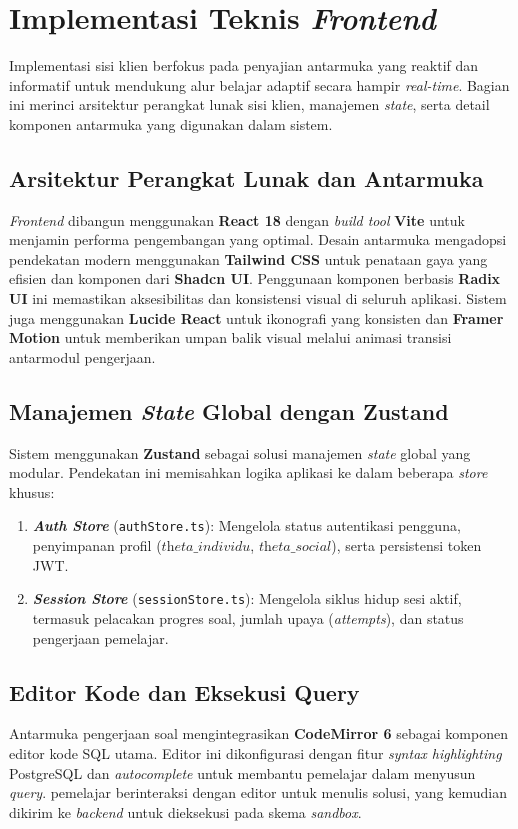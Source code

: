 \section{Implementasi Teknis \textit{Frontend}}
\label{sec:frontend_implementation}

Implementasi sisi klien berfokus pada penyajian antarmuka yang reaktif dan informatif untuk mendukung alur belajar adaptif secara hampir \textit{real-time}. Bagian ini merinci arsitektur perangkat lunak sisi klien, manajemen \textit{state}, serta detail komponen antarmuka yang digunakan dalam sistem.

\subsection{Arsitektur Perangkat Lunak dan Antarmuka}
\textit{Frontend} dibangun menggunakan \textbf{React 18} dengan \textit{build tool} \textbf{Vite} untuk menjamin performa pengembangan yang optimal. Desain antarmuka mengadopsi pendekatan modern menggunakan \textbf{Tailwind CSS} untuk penataan gaya yang efisien dan komponen dari \textbf{Shadcn UI}. Penggunaan komponen berbasis \textbf{Radix UI} ini memastikan aksesibilitas dan konsistensi visual di seluruh aplikasi. Sistem juga menggunakan \textbf{Lucide React} untuk ikonografi yang konsisten dan \textbf{Framer Motion} untuk memberikan umpan balik visual melalui animasi transisi antarmodul pengerjaan.

\subsection{Manajemen \textit{State} Global dengan Zustand}
Sistem menggunakan \textbf{Zustand} sebagai solusi manajemen \textit{state} global yang modular. Pendekatan ini memisahkan logika aplikasi ke dalam beberapa \textit{store} khusus:
\begin{enumerate}
    \item \textbf{\textit{Auth Store}} (\texttt{auth\allowbreak Store.ts}): Mengelola status autentikasi pengguna, penyimpanan profil ($\textit{theta\_individu}$, $\textit{theta\_social}$), serta persistensi token JWT.
    \item \textbf{\textit{Session Store}} (\texttt{session\allowbreak Store.ts}): Mengelola siklus hidup sesi aktif, termasuk pelacakan progres soal, jumlah upaya (\textit{attempts}), dan status pengerjaan pemelajar.
\end{enumerate}

\subsection{Editor Kode dan Eksekusi Query}
Antarmuka pengerjaan soal mengintegrasikan \textbf{CodeMirror 6} sebagai komponen editor kode SQL utama. Editor ini dikonfigurasi dengan fitur \textit{syntax highlighting} PostgreSQL dan \textit{autocomplete} untuk membantu pemelajar dalam menyusun \textit{query}. pemelajar berinteraksi dengan editor untuk menulis solusi, yang kemudian dikirim ke \textit{backend} untuk dieksekusi pada skema \textit{sandbox}.

